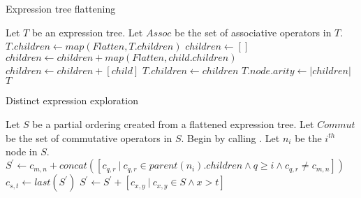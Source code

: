 \documentclass{article}
\begin{document}
\begin{algorithm}
\caption{Expression tree flattening}
\begin{algorithmic}
  \State Let $T$ be an expression tree.
  \State Let $Assoc$ be the set of associative operators in $T$.
  \State $T.children \gets map(Flatten, T.children)$
  \Else
  \State $children \gets []$
  \State $children \gets children + map(Flatten, child.children)$
  \Else
  \State $children \gets children + [child]$
  \EndIf
  \EndFor
  \State $T.children \gets children$
  \State $T.node.arity \gets |children|$
  \EndIf
  \State \Return $T$
  \EndFunction
\end{algorithmic}
\end{algorithm}


\begin{algorithm}
  \caption{Distinct expression exploration}
  \begin{algorithmic}
    \State Let $S$ be a partial ordering created from a flattened expression tree.
    \State Let $Commut$ be the set of commutative operators in $S$.
    \State Begin by calling .
    \State Let $n_i$ be the $i^{th}$ node in $S$.
    \State $S^\prime \gets c_{m,n} + concat([c_{q,r} ~|~ c_{q,r} \in
    parent(n_i).children \land q \geq i \land c_{q,r} \neq c_{m,n}])$
    \State $c_{s,t} \gets last(S^\prime)$
    \State $S^\prime \gets S^\prime + [c_{x,y} ~|~ c_{x,y} \in S \land x > t]$
    \State {}
    \EndFor 
    \EndIf
    \State {}
    \EndFunction
  \end{algorithmic}
\end{algorithm}
  
\end{document}
